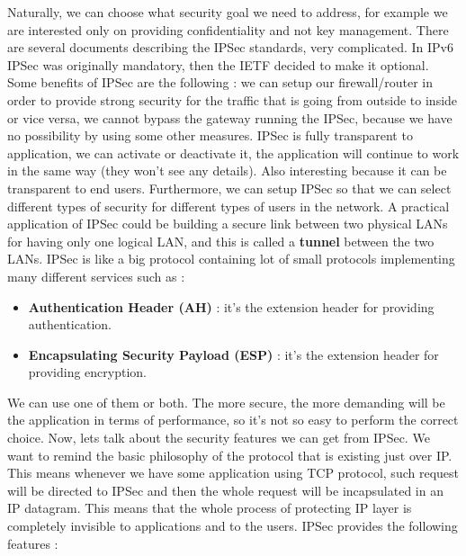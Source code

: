 \documentclass[11pt]{article}
\begin{document}
Naturally, we can choose what security goal we need to address, for example we are interested only on providing confidentiality and not key management. There are several documents describing the IPSec standards, very complicated. In IPv6 IPSec was originally mandatory, then the IETF decided to make it optional. Some benefits of IPSec are the following : we can setup our firewall/router in order to provide strong security for the traffic that is going from outside to inside or vice versa, we cannot bypass the gateway running the IPSec, because we have no possibility by using some other measures. IPSec is fully transparent to application, we can activate or deactivate it, the application will continue to work in the same way (they won't see any details). Also interesting because it can be transparent to end users. Furthermore, we can setup IPSec so that we can select different types of security for different types of users in the network. A practical application of IPSec could be building a secure link between two physical LANs for having only one logical LAN, and this is called a \textbf{tunnel} between the two LANs. IPSec is like a big protocol containing lot of small protocols implementing many different services such as :
\begin{itemize}
\item \textbf{Authentication Header (AH)} : it's the extension header for providing authentication.
\item \textbf{Encapsulating Security Payload (ESP)} : it's the extension header for providing encryption.
\end{itemize}
We can use one of them or both. The more secure, the more demanding will be the application in terms of performance, so it's not so easy to perform the correct choice. Now, lets talk about the security features we can get from IPSec. We want to remind the basic philosophy of the protocol that is existing just over IP. This means whenever we have some application using TCP protocol, such request will be directed to IPSec and then the whole request will be incapsulated in an IP datagram. This means that the whole process of protecting IP layer is completely invisible to applications and to the users. IPSec provides the following features :
\end{document}
